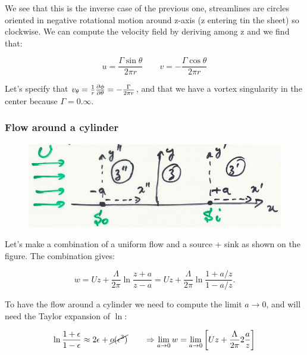  		We see that this is the inverse case of the previous one, streamlines are circles oriented in negative rotational motion around z-axis (z entering tin the sheet) so clockwise. We can compute the velocity field by deriving among z and we find that: 
 		
 		\begin{equation}
 		u = \frac{\Gamma \sin \theta}{2 \pi r} \qquad v = -\frac{\Gamma \cos \theta}{2\pi r}
 		\end{equation}
 		
 		Let's specify that $v_\theta = \frac{1}{r} \frac{\D \phi}{\D \theta} = -\frac{\Gamma}{2 \pi r}$, and that we have a vortex singularity in the center because $\Gamma = 0. \infty$.
 		
 	\subsubsection{Flow around a cylinder}
 		\begin{figure}
		\vspace{-5mm}
		\includegraphics[scale=0.33]{ch2/27}
		\end{figure}
		Let's make a combination of a uniform flow and a source + sink as shown on the figure. The combination gives:
		
		\begin{equation}
		w = Uz + \frac{\Lambda}{2\pi} \ln \frac{z+a}{z-a}= Uz + \frac{\Lambda}{2\pi} \ln \frac{1+a/z}{1-a/z}.
		\end{equation}
		
		To have the flow around a cylinder we need to compute the limit $a\rightarrow 0$, and will need the Taylor expansion of $\ln$:
		
		\begin{equation}
		\ln \frac{1+\epsilon}{1-\epsilon} \approx 2 \epsilon + \cancel{o(\epsilon ^3)} \qquad \Rightarrow \lim _{a\rightarrow 0} w = \lim _{a \rightarrow 0} \left[ Uz + \frac{\Lambda}{2\pi} 2 \frac{a}{z} \right]
		\end{equation}
		
